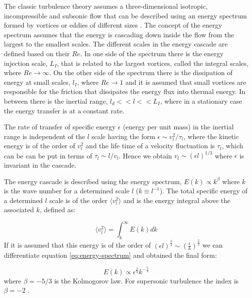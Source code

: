 \documentclass[fleqn,usenatbib, useAMS, a4paper]{mnras}
\begin{document}
The classic turbulence theory assumes a three-dimensional isotropic, incompressible and subsonic flow that can be described using an energy spectrum formed by vortices or eddies of different sizes \citep{kolm1}.
The concept of the energy spectrum assumes that the energy is cascading down inside the flow from the largest to the smallest scales.
The different scales in the energy cascade are defined based on their \(Re\).
In one side of the spectrum there is the energy injection scale, \(L_I\), that is related to the largest vortices, called the integral scales, where \(Re \rightarrow \infty\).
On the other side of the spectrum there is the dissipation of energy at small scales, \(l_I\), where  \(Re \rightarrow 1\) and it is assumed that small vortices are responsible for the friction that dissipates the energy flux into thermal energy.
In between there is the inertial range, \(l_d  << l << L_I\), where in a stationary case the energy transfer is at a constant rate.

The rate of transfer of specific energy \(\epsilon\) (energy per unit mass) in the inertial range is independent of the \(l\) scale having the form \(\epsilon \sim v_l^2 / \tau_l\), where the kinetic energy is of the order of \( v_l^2\) and the life time of a velocity fluctuation is \(\tau_l\), which can be can be put in terms of \(\tau_l \sim l / v_l\). 
Hence we obtain \( v_l \sim (\epsilon l)^{1/3}\) where \(\epsilon\) is invariant in the cascade.

The energy cascade is described using the energy spectrum, $E(k) \propto k^{\beta}$ where \(k\) is the wave number for a determined scale \(l\) ($k \equiv l^{-1}$).
The total specific energy of a determined $l$ scale is of the order \(\langle v_{l}^{2} \rangle \) and is the energy integral above the associated \(k\), defined as:

\begin{equation}\label{eq:energy-spectrum}
 \langle v_{l}^{2} \rangle = \int_{k}^{\infty} E(k)dk
\end{equation}
%
If it is assumed that this energy is of the order of $(\epsilon l)^{\frac{2}{3}} \sim (\frac{\epsilon}{k})^{\frac{2}{3}}$ we can differentiate equation \ref{eq:energy-spectrum} and obtained the final form:

\begin{equation}\label{eq:kolmogorov-law}
E(k) \propto \epsilon^\frac{2}{3} k^{-\frac{5}{3}}
\end{equation}
%
where \(\beta = -5 / 3\) is the Kolmogorov law.
For supersonic turbulence the index is $\beta=-2$ \citep{burg}. 
\end{document}
